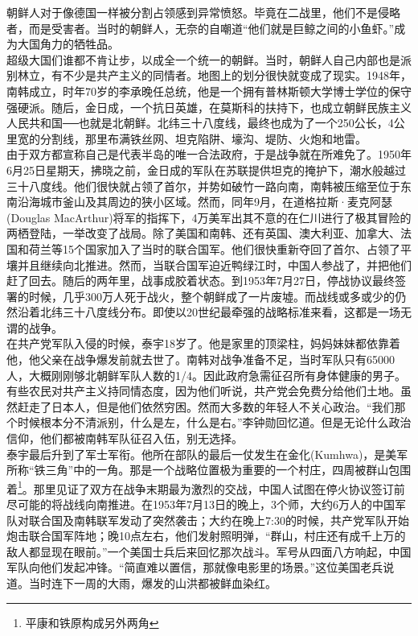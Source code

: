 朝鲜人对于像德国一样被分割占领感到异常愤怒。毕竟在二战里，他们不是侵略者，而是受害者。当时的朝鲜人，无奈的自嘲道“他们就是巨鲸之间的小鱼虾。”成为大国角力的牺牲品。\\

超级大国们谁都不肯让步，以成全一个统一的朝鲜。当时，朝鲜人自己内部也是派别林立，有不少是共产主义的同情者。地图上的划分很快就变成了现实。1948年，南韩成立，时年70岁的李承晚任总统，他是一个拥有普林斯顿大学博士学位的保守强硬派。随后，金日成，一个抗日英雄，在莫斯科的扶持下，也成立朝鲜民族主义人民共和国──也就是北朝鲜。北纬三十八度线，最终也成为了一个250公长，4公里宽的分割线，那里布满铁丝网、坦克陷阱、壕沟、堤防、火炮和地雷。\\

由于双方都宣称自己是代表半岛的唯一合法政府，于是战争就在所难免了。1950年6月25日星期天，拂晓之前，金日成的军队在苏联提供坦克的掩护下，潮水般越过三十八度线。他们很快就占领了首尔，并势如破竹一路向南，南韩被压缩至位于东南沿海城市釜山及其周边的狭小区域。然而，同年9月，在道格拉斯·麦克阿瑟(Douglas MacArthur)将军的指挥下，4万美军出其不意的在仁川进行了极其冒险的两栖登陆，一举改变了战局。除了美国和南韩、还有英国、澳大利亚、加拿大、法国和荷兰等15个国家加入了当时的联合国军。他们很快重新夺回了首尔、占领了平壤并且继续向北推进。然而，当联合国军迫近鸭绿江时，中国人参战了，并把他们赶了回去。随后的两年里，战事成胶着状态。到1953年7月27日，停战协议最终签署的时候，几乎300万人死于战火，整个朝鲜成了一片废墟。而战线或多或少的仍然沿着北纬三十八度线分布。即使以20世纪最牵强的战略标准来看，这都是一场无谓的战争。\\

在共产党军队入侵的时候，泰宇18岁了。他是家里的顶梁柱，妈妈妹妹都依靠着他，他父亲在战争爆发前就去世了。南韩对战争准备不足，当时军队只有65000人，大概刚刚够北朝鲜军队人数的1/4。因此政府急需征召所有身体健康的男子。有些农民对共产主义持同情态度，因为他们听说，共产党会免费分给他们土地。虽然赶走了日本人，但是他们依然穷困。然而大多数的年轻人不关心政治。“我们那个时候根本分不清派别，什么是左，什么是右。”李钟勋回忆道。但是无论什么政治信仰，他们都被南韩军队征召入伍，别无选择。\\

泰宇最后升到了军士军衔。他所在部队的最后一仗发生在金化(Kumhwa)，是美军所称“铁三角”中的一角。那是一个战略位置极为重要的一个村庄，四周被群山包围着\footnote{平康和铁原构成另外两角}。那里见证了双方在战争末期最为激烈的交战，中国人试图在停火协议签订前尽可能的将战线向南推进。在1953年7月13日的晚上，3个师，大约6万人的中国军队对联合国及南韩联军发动了突然袭击；大约在晚上7:30的时候，共产党军队开始炮击联合国军阵地；晚10点左右，他们发射照明弹，“群山，村庄还有成千上万的敌人都显现在眼前。”一个美国士兵后来回忆那次战斗。军号从四面八方响起，中国军队向他们发起冲锋。“简直难以置信，那就像电影里的场景。”这位美国老兵说道。当时连下一周的大雨，爆发的山洪都被鲜血染红。\\

